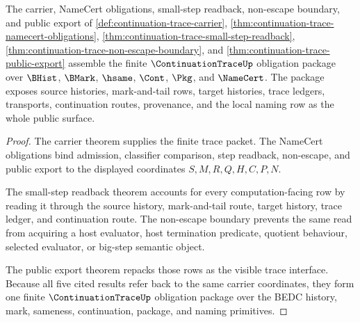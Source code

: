 \begin{theorem}
\label{thm:continuation-trace-obligation-closure-package}
The carrier, NameCert obligations, small-step readback, non-escape boundary, and public export of \autoref{def:continuation-trace-carrier}, \autoref{thm:continuation-trace-namecert-obligations}, \autoref{thm:continuation-trace-small-step-readback}, \autoref{thm:continuation-trace-non-escape-boundary}, and \autoref{thm:continuation-trace-public-export} assemble the finite $\ContinuationTraceUp$ obligation package over $\BHist$, $\BMark$, $\hsame$, $\Cont$, $\Pkg$, and $\NameCert$. The package exposes source histories, mark-and-tail rows, target histories, trace ledgers, transports, continuation routes, provenance, and the local naming row as the whole public surface.
\end{theorem}
\begin{proof}
The carrier theorem supplies the finite trace packet. The NameCert obligations bind admission, classifier comparison, step readback, non-escape, and public export to the displayed coordinates $S,M,R,Q,H,C,P,N$.

The small-step readback theorem accounts for every computation-facing row by reading it through the source history, mark-and-tail route, target history, trace ledger, and continuation route. The non-escape boundary prevents the same read from acquiring a host evaluator, host termination predicate, quotient behaviour, selected evaluator, or big-step semantic object.

The public export theorem repacks those rows as the visible trace interface. Because all five cited results refer back to the same carrier coordinates, they form one finite $\ContinuationTraceUp$ obligation package over the BEDC history, mark, sameness, continuation, package, and naming primitives.
\end{proof}

